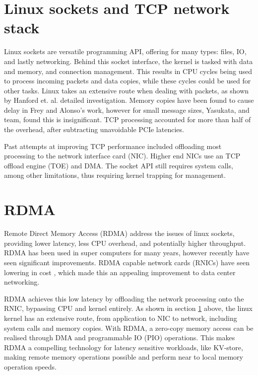 \section[Linux scokets and TCP]{Linux sockets and TCP network stack}\label{sec:linux-sockets}
Linux sockets are versatile programming API, offering for many types: files, IO, and lastly networking.
Behind this socket interface, the kernel is tasked with data and memory, and connection management\cite{hanford2018survey, seth2009tcp}.
This results in CPU cycles being used to process incoming packets and data copies, while these cycles could be used for other tasks.
Linux takes an extensive route when dealing with packets, as shown by Hanford et. al. detailed investigation\cite{hanford2018survey}.
Memory copies have been found to cause delay in Frey and Alonso's work\cite{frey2009minimizing}, however for small message sizes, Yasukata, and team, found this is insignificant\cite{yasukata2016stackmap}.
TCP processing accounted for more than half of the overhead, after subtracting unavoidable PCIe latencies.

Past attempts at improving TCP performance included offloading most processing to the network interface card (NIC)\cite{hanford2018survey}.
Higher end NICs use an TCP offload engine (TOE) and DMA.
The socket API still requires system calls, among other limitations, thus requiring kernel trapping for management.

\section[RDMA]{RDMA}\label{sec:rdma}
Remote Direct Memory Access (RDMA) address the issues of linux sockets, providing lower latency, less CPU overhead, and potentially higher throughput.
RDMA has been used in super computers for many years, however recently have seen significant improvements.
RDMA capable network cards (RNICs) have seen lowering in cost \cite{kalia2016design}, which made this an appealing improvement to data center networking.

RDMA achieves this low latency by offloading the network processing onto the RNIC, bypassing CPU and kernel entirely.
As shown in section \ref{sec:linux-sockets} above, the linux kernel has an extensive route, from application to NIC to network, including system calls and memory copies.
With RDMA, a zero-copy memory access can be realised through DMA and programmable IO (PIO) operations.
This makes RDMA a compelling technology for latency sensitive workloads, like KV-store, making remote memory operations possible and perform near to local memory operation speeds.

